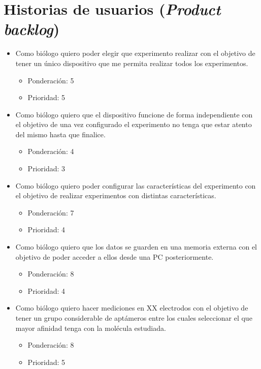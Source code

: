 \documentclass[11pt]{charter}
\begin{document}
\section{Historias de usuarios (\textit{Product backlog})}
\label{sec:backlog}

\begin{itemize}

\item Como biólogo quiero poder elegir que experimento realizar con el objetivo de tener un único dispositivo que me permita realizar todos los experimentos.
\begin{itemize}
\item Ponderación: 5
\item Prioridad: 5
\end{itemize}

\item Como biólogo quiero que el dispositivo funcione de forma independiente con el objetivo de una vez configurado el experimento no tenga que estar atento del mismo hasta que finalice.
\begin{itemize}
\item Ponderación: 4
\item Prioridad: 3
\end{itemize}

\item Como biólogo quiero poder configurar las características del experimento con el objetivo de realizar experimentos con distintas características.
\begin{itemize}
\item Ponderación: 7
\item Prioridad: 4
\end{itemize}

\item Como biólogo quiero que los datos se guarden en una memoria externa con el objetivo de poder acceder a ellos desde una PC posteriormente.
\begin{itemize}
\item Ponderación: 8 
\item Prioridad: 4
\end{itemize}

\item Como biólogo quiero hacer mediciones en XX electrodos con el objetivo de tener un grupo considerable de aptámeros entre los cuales seleccionar el que mayor afinidad tenga con la molécula estudiada.
\begin{itemize}
\item Ponderación: 8
\item Prioridad: 5
\end{itemize}


\end{itemize}
\end{document}
